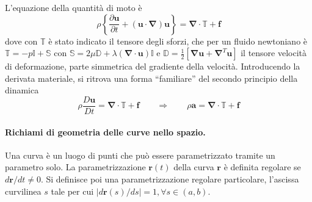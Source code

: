 
L'equazione della quantità di moto è
\begin{equation}
 \rho \left\{ \frac{\partial \bm{u}}{\partial t} +
   \left( \bm{u} \cdot \bm{\nabla} \right) \bm{u} \right\} = 
   \bm{\nabla} \cdot \mathbb{T} + \bm{f}
\end{equation}
dove con $\mathbb{T}$ è stato indicato il tensore degli sforzi,
 che per un fluido newtoniano è $\mathbb{T} = -p \mathbb{I} + \mathbb{S}$
 con $\mathbb{S} = 2 \mu \mathbb{D} + \lambda \left( 
 \bm{\nabla} \cdot \bm{u} \right) \mathbb{I}$ e $\mathbb{D} = \frac{1}{2}
 \left[ \bm{\nabla}\bm{u} + \bm{\nabla}^T \bm{u} \right]$ il tensore
 velocità di deformazione, parte simmetrica del gradiente della velocità.
%
Introducendo la derivata materiale, si ritrova una forma ``familiare''
 del secondo principio della dinamica
\begin{equation}
 \rho\frac{D\bm{u}}{D t} = \bm{\nabla} \cdot \mathbb{T} + \bm{f}
  \qquad \Rightarrow \qquad
 \rho\bm{a} = \bm{\nabla} \cdot \mathbb{T} + \bm{f}
\end{equation}
%
\paragraph{Richiami di geometria delle curve nello spazio.}
Una curva è un luogo di punti che può essere parametrizzato tramite un
 parametro solo.
La parametrizzazione $\bm{r}(t)$ della curva $\bm{r}$ è definita regolare 
 se $d\bm{r}/dt \ne 0$. Si definisce poi una parametrizzazione regolare
 particolare, l'ascissa curvilinea $s$ tale per cui $\left| d\bm{r}(s)/ds
 \right| = 1, \forall s \in (a,b)$.

